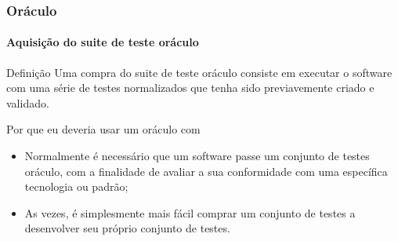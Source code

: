 \begin{frame}[hasprev=true, hasnext=false]
\label{concept:purchased-test-suite-oracle}
\frametitle{Oráculo}
\framesubtitle{Aquisição do suite de teste oráculo}

\begin{block:concept}{Definição}
Uma compra do suite de teste oráculo consiste em executar o software com uma série de testes normalizados que tenha sido previavemente criado e validado.
\end{block:concept}

\begin{block:fact}{Por que eu deveria usar um oráculo com}
\begin{itemize}
	\item Normalmente é necessário que um software passe um conjunto de testes oráculo, com a finalidade de avaliar a sua conformidade com uma específica tecnologia ou padrão;

	\item As vezes, é simplesmente mais fácil comprar um conjunto de testes a desenvolver seu próprio conjunto de testes.
\end{itemize}
\end{block:fact}


\hfill
{}
\end{frame}
